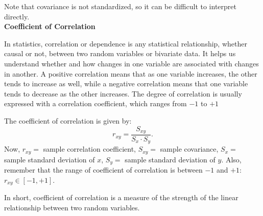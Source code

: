 Note that covariance is not standardized, so it can be difficult to interpret directly.\\

\textbf{Coefficient of Correlation}

In statistics, correlation or dependence is any statistical relationship, whether causal or not, between two random variables or bivariate data. It helps us understand whether and how changes in one variable are associated with changes in another. A positive correlation means that as one variable increases, the other tends to increase as well, while a negative correlation means that one variable tends to decrease as the other increases. The degree of correlation is usually expressed with a correlation coefficient, which ranges from $-1$ to $+1$

\begin{definition}
The coefficient of correlation is given by: \[ r_{xy} = \frac{S_{xy}}{S_x \cdot S_y}.\]
Now, $r_{xy} = $ sample correlation coefficient, $S_{xy} = $ sample covariance, $S_{x} = $ sample standard deviation of $x$, $S_{y} = $ sample standard deviation of $y$. Also, remember that the range of coefficient of correlation is between $-1$ and $+1$: $r_{xy} \in [-1, +1]$.
\end{definition}

In short, coefficient of correlation is a measure of the strength of the linear relationship between two random variables.

